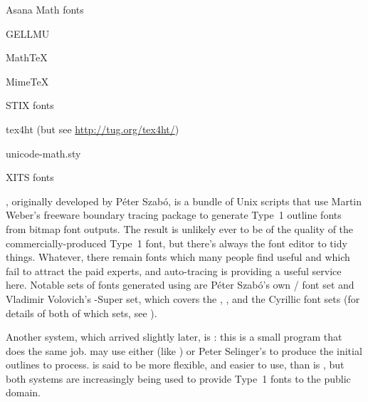 \begin{ctanrefs}
\item[\nothtml{\rmfamily}Asana Math fonts]
\item[GELLMU]
\item[MathTeX]
\item[MimeTeX]
\item[\nothtml{\rmfamily}STIX fonts]
\item[tex4ht] (but see \url{http://tug.org/tex4ht/})
\item[unicode-math.sty]
\item[\nothtml{\rmfamily}XITS fonts]
\end{ctanrefs}


, originally developed by  P\'eter Szab\'o, is a
bundle of Unix scripts that use  Martin Weber's freeware boundary
tracing package
\href{http://autotrace.sourceforge.net}{} to 
generate Type~1 outline fonts from \MF{} bitmap 
font outputs.  The result is unlikely ever to be of the quality of
the commercially-produced Type~1 font, but there's always the
\href{http://fontforge.sourceforge.net/}{} font
editor to tidy things.  Whatever, there
remain fonts which many people find useful and which fail to attract
the paid experts, and auto-tracing is providing a useful service here.
Notable sets of
fonts generated using  are P\'eter Szab\'o's own
/ font set  and Vladimir Volovich's
-Super set, which covers the , , and the
Cyrillic  font sets (for details of both of which sets, see
).

Another system, which arrived slightly later, is 
\href{http://www.cs.uu.nl/~hanwen/mftrace/}{}:
this is a small  program that does the same job.
 may use either  (like
) or Peter Selinger's
\href{http://potrace.sourceforge.net}{} to produce
the initial outlines to process.   is said to be
more flexible, and easier to use, than is , but both systems
are increasingly being used to provide Type~1 fonts to the public domain.

